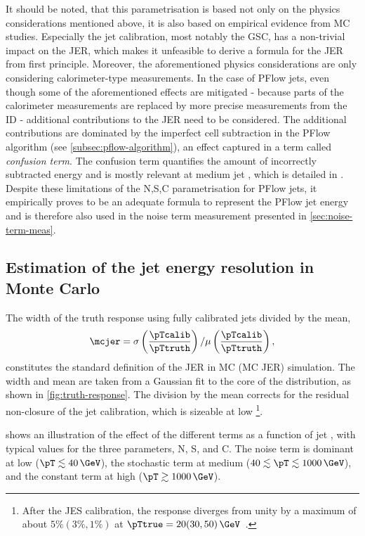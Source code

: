 It should be noted, that this parametrisation is based not only on the physics considerations mentioned above, it is also based on empirical evidence from MC studies. Especially the jet calibration, most notably the GSC, has a non-trivial impact on the JER, which makes it unfeasible to derive a formula for the JER from first principle.
Moreover, the aforementioned physics considerations are only considering calorimeter-type measurements. In the case of PFlow jets, even though some of the aforementioned effects are mitigated - because parts of the calorimeter measurements are replaced by more precise measurements from the ID - additional contributions to the JER need to be considered. The additional contributions are dominated by the imperfect cell subtraction in the PFlow algorithm (see \cref{subsec:pflow-algorithm}), an effect captured in a term called \emph{confusion term}. The confusion term quantifies the amount of incorrectly subtracted energy and is mostly relevant at medium jet \pT, which is detailed in .
Despite these limitations of the N,S,C parametrisation for PFlow jets, it empirically proves to be an adequate formula to represent the PFlow jet energy and is therefore also used in the noise term measurement presented in \cref{sec:noise-term-meas}.




\subsection{Estimation of the jet energy resolution in Monte Carlo}
The width of the truth response using fully calibrated jets  divided by the mean,
\begin{equation}
    \mcjer = \sigma \left( \frac{\pTcalib}{\pTtruth} \right) / \mu \left( \frac{\pTcalib}{\pTtruth} \right),
\end{equation}
constitutes the standard definition of the JER in MC (MC JER) simulation.
The width and mean are taken from a Gaussian fit to the core of the distribution, as shown in \cref{fig:truth-response}. The division by the mean corrects for the residual non-closure of the jet calibration, which is sizeable at low \pT\footnote{After the JES calibration, the response diverges from unity by a maximum of about $5\% (3\%, 1\%)$ at $\pTtrue = 20 (30, 50)\,\GeV$~\cite{JETM-2018-05}.}.

 shows an illustration of the effect of the different terms as a function of jet \pT, with typical values for the three parameters, N, S, and C. The noise term is dominant at low \pT ($\pT \lesssim 40\,\GeV$), the stochastic term at medium \pT ($40 \lesssim \pT \lesssim 1000\,\GeV$), and the constant term at high \pT ($\pT \gtrsim 1000\,\GeV$).

